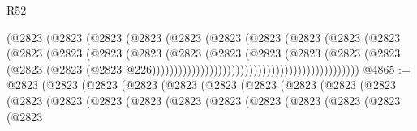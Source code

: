 \begin{lexlean}{R52}
\begin{coremodule}
                                                    (@2823
                                                      (@2823
                                                        (@2823
                                                          (@2823
                                                            (@2823
                                                              (@2823
                                                                (@2823
                                                                  (@2823
                                                                    (@2823
                                                                      (@2823
                                                                        (@2823
                                                                          (@2823
                                                                            (@2823
                                                                              (@2823
                                                                                (@2823
                                                                                  (@2823
                                                                                    (@2823
                                                                                      (@2823
                                                                                        (@2823
                                                                                          (@2823
                                                                                            (@2823
                                                                                              (@2823
                                                                                                (@2823
                                                                                                  @226)))))))))))))))))))))))))))))))))))))))))))))))
@4865 := @2823
    (@2823
      (@2823
        (@2823
          (@2823
            (@2823
              (@2823
                (@2823
                  (@2823
                    (@2823
                      (@2823
                        (@2823
                          (@2823
                            (@2823
                              (@2823
                                (@2823
                                  (@2823
                                    (@2823
                                      (@2823
                                        (@2823
                                          (@2823

\end{coremodule}
\end{lexlean}
